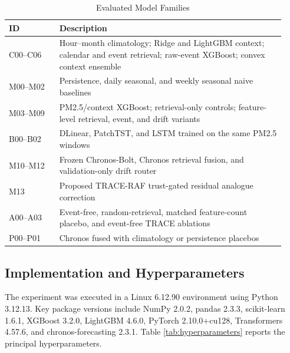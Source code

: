 \documentclass{ieeeaccess}
\begin{document}
\begin{table}[!t]
\centering
\caption{Evaluated Model Families}
\label{tab:model_families}
\begin{tabular}{p{0.17\linewidth}p{0.76\linewidth}}
\toprule
ID & Description \\
\midrule
C00--C06 & Hour--month climatology; Ridge and LightGBM context; calendar and
event retrieval; raw-event XGBoost; convex context ensemble \\
M00--M02 & Persistence, daily seasonal, and weekly seasonal naive baselines \\
M03--M09 & PM2.5/context XGBoost; retrieval-only controls; feature-level
retrieval, event, and drift variants \\
B00--B02 & DLinear, PatchTST, and LSTM trained on the same PM2.5 windows \\
M10--M12 & Frozen Chronos-Bolt, Chronos retrieval fusion, and validation-only
drift router \\
M13 & Proposed TRACE-RAF trust-gated residual analogue correction \\
A00--A03 & Event-free, random-retrieval, matched feature-count placebo, and
event-free TRACE ablations \\
P00--P01 & Chronos fused with climatology or persistence placebos \\
\bottomrule
\end{tabular}
\end{table}

\subsection{Implementation and Hyperparameters}
The experiment was executed in a Linux 6.12.90 environment using Python 3.12.13.
Key package versions include NumPy 2.0.2, pandas 2.3.3, scikit-learn 1.6.1, XGBoost
3.2.0, LightGBM 4.6.0, PyTorch 2.10.0+cu128, Transformers 4.57.6, and
chronos-forecasting 2.3.1. Table
\ref{tab:hyperparameters} reports the principal hyperparameters.
\end{document}
